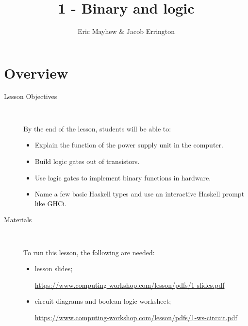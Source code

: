 \documentclass[11pt]{article}
\title{1 - Binary and logic}
\author{Eric Mayhew \& Jacob Errington}
\date{}
\newcommand{\cwurl}{https://www.computing-workshop.com/lesson/pdfs/}
\begin{document}
\maketitle

\section*{Overview}

\begin{description}
  \item[Lesson Objectives] ~

   By the end of the lesson, students will be able to:

  \begin{itemize}
    \item Explain the function of the power supply unit in the computer.


    \item Build logic gates out of transistors.

    \item Use logic gates to implement binary functions in hardware.

    \item Name a few basic Haskell types and use an interactive Haskell prompt
      like GHCi.
  \end{itemize}

  \item [Materials]~

    To run this lesson, the following are needed:

    \begin{itemize}
      \item
        lesson slides;

        \url{\cwurl 1-slides.pdf}

      \item
        circuit diagrams and boolean logic worksheet;

        \url{\cwurl 1-ws-circuit.pdf}
    \end{itemize}
\end{description}
\end{document}
